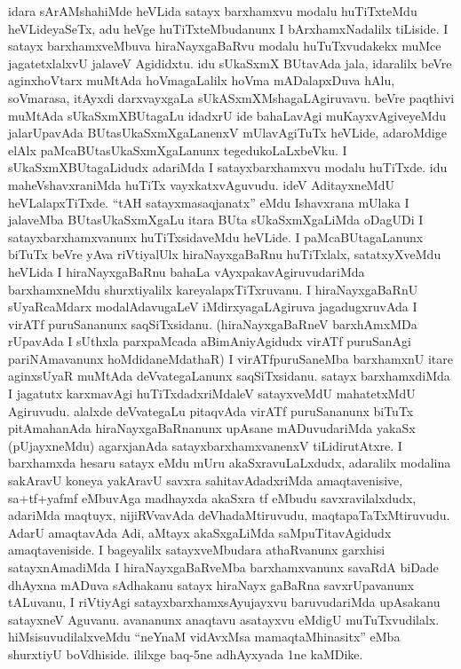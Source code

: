 \begin{artha}
idara sArAMsha\ndash  hiMde heVLida satayx barxhamxvu modalu huTiTxteMdu heVLideyaSeTx, adu heVge huTiTxteMbudanunx I bArxhamxNadalilx tiLiside. I satayx barxhamxveMbuva hiraNayxgaBaRvu modalu huTuTxvudakekx muMce jagatetxlalxvU jalaveV Agididxtu. idu sUkaSxmX BUtavAda jala, idaralilx beVre aginxhoVtarx muMtAda hoVmagaLalilx hoVma mADalapxDuva hAlu, soVmarasa, itAyxdi darxvayxgaLa sUkASxmXMshagaLAgiruvavu. beVre paqthivi muMtAda sUkaSxmX\break BUtagaLu idadxrU ide bahaLavAgi muKayxvAgiveyeMdu jalarUpavAda BUtasUkaSxmXgaLanenxV mUlavAgiTuTx heVLide, adaroMdige elAlx paMcaBUtasUkaSxmXgaLanunx tegedukoLaLxbeVku. I sUkaSxmXBUtagaLidudx adariMda I satayxbarxhamxvu modalu huTiTxde. idu maheVshavxraniMda huTiTx vayxkatxvAguvudu. ideV AditayxneMdU heVLalapxTiTxde. ``tAH satayxmasaqjanatx'' eMdu Ishavxrana mUlaka I jalaveMba BUtasUkaSxmXgaLu itara BUta sUkaSxmXgaLiMda oDagUDi I satayxbarxhamxvanunx huTiTxsidaveMdu heVLide. I paMcaBUtagaLanunx biTuTx beVre yAva riVtiyalUlx hiraNayxgaBaRnu huTiTxlalx, satatxyXveMdu heVLida I hiraNayxgaBaRnu bahaLa vAyxpakavAgiruvudariMda barxhamxneMdu shurxtiyalilx kareyalapxTiTxruvanu. I hiraNayxgaBaRnU sUyaRcaMdarx modalAdavugaLeV iMdirxyagaLAgiruva jagadugxruvAda I virATf puruSananunx saqSiTxsidanu. (hiraNayxgaBaRneV barxhAmxMDa rUpavAda I sUthxla parxpaMcada aBimAniyAgidudx virATf puruSanAgi pariNAmavanunx hoMdidaneMdathaR) I virATfpuruSaneMba barxhamxnU itare aginxsUyaR muMtAda deVvategaLanunx saqSiTxsidanu. satayx barxhamxdiMda I jagatutx karxmavAgi huTiTxdadxriMdaleV satayxveMdU mahatetxMdU Agiruvudu. alalxde deVvategaLu pitaqvAda virATf puruSananunx biTuTx pitAmahanAda hiraNayxgaBaRnanunx upAsane mADuvudariMda yakaSx (pUjayxneMdu) agarxjanAda satayxbarxhamxvanenxV tiLidirutAtxre. I barxhamxda hesaru satayx eMdu mUru akaSxravuLaLxdudx, adaralilx modalina sakAravU koneya yakAravU savxra sahitavAdadxriMda amaqtavenisive, sa+tf+yafmf eMbuvAga madhayxda akaSxra tf eMbudu savxravilalxdudx, adariMda maqtuyx, nijiRVvavAda deVhadaMtiruvudu, maqtapaTaTxMtiruvudu. AdarU amaqtavAda Adi, aMtayx akaSxgaLiMda saMpuTitavAgidudx amaqtaveniside. I bageyalilx satayxveMbudara athaRvanunx garxhisi satayxnAmadiMda I hiraNayxgaBaRveMba barxhamxvanunx savaRdA biDade dhAyxna mADuva sAdhakanu satayx hiraNayx gaBaRna savxrUpavanunx tALuvanu, I riVtiyAgi satayxbarxhamxsAyujayxvu baruvudariMda upAsakanu satayxneV Aguvanu. avananunx anaqtavu asatayxvu eMdigU muTuTxvudilalx. hiMsisuvudilalxveMdu ``neYnaM vidAvxMsa mamaqtaMhinasitx'' eMba shurxtiyU boVdhiside. ililxge baq-5ne adhAyxyada 1ne kaMDike.
\end{artha}

